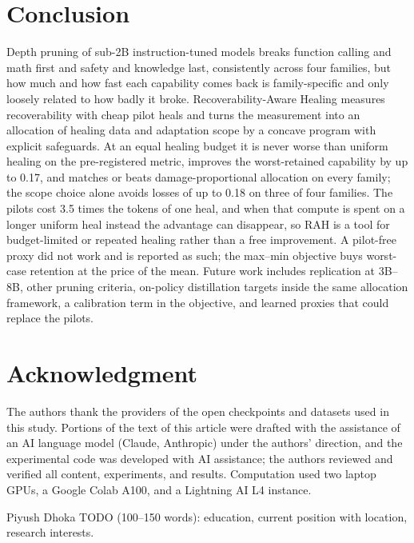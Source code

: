 \documentclass{ieeeaccess}
\newcommand{\RAH}{RAH}
\begin{document}
\section{Conclusion}
\label{sec:conclusion}
Depth pruning of sub-2B instruction-tuned models breaks function calling and math first and safety and knowledge last, consistently across four families, but how much and how fast each capability comes back is family-specific and only loosely related to how badly it broke. Recoverability-Aware Healing measures recoverability with cheap pilot heals and turns the measurement into an allocation of healing data and adaptation scope by a concave program with explicit safeguards. At an equal healing budget it is never worse than uniform healing on the pre-registered metric, improves the worst-retained capability by up to 0.17, and matches or beats damage-proportional allocation on every family; the scope choice alone avoids losses of up to 0.18 on three of four families. The pilots cost 3.5 times the tokens of one heal, and when that compute is spent on a longer uniform heal instead the advantage can disappear, so \RAH{} is a tool for budget-limited or repeated healing rather than a free improvement. A pilot-free proxy did not work and is reported as such; the max--min objective buys worst-case retention at the price of the mean. Future work includes replication at 3B--8B, other pruning criteria, on-policy distillation targets inside the same allocation framework, a calibration term in the objective, and learned proxies that could replace the pilots.

\section*{Acknowledgment}
The authors thank the providers of the open checkpoints and datasets used in this study. Portions of the text of this article were drafted with the assistance of an AI language model (Claude, Anthropic) under the authors' direction, and the experimental code was developed with AI assistance; the authors reviewed and verified all content, experiments, and results. Computation used two laptop GPUs, a Google Colab A100, and a Lightning AI L4 instance.




\begin{IEEEbiographynophoto}{Piyush Dhoka}
TODO (100--150 words): education, current position with location, research interests.
\end{IEEEbiographynophoto}
\end{document}
